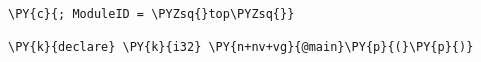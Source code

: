 \begin{Verbatim}[commandchars=\\\{\}]
\PY{c}{; ModuleID = \PYZsq{}top\PYZsq{}}

\PY{k}{declare} \PY{k}{i32} \PY{n+nv+vg}{@main}\PY{p}{(}\PY{p}{)}
\end{Verbatim}
